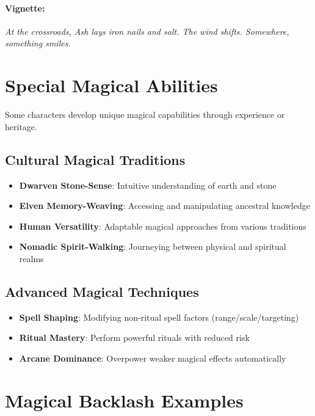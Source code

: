 \paragraph{Vignette:}
\emph{At the crossroads, Ash lays iron nails and salt. The wind shifts. Somewhere, something smiles.}

\section{Special Magical Abilities} 

Some characters develop unique magical capabilities through experience or heritage.

\subsection*{Cultural Magical Traditions}
\begin{itemize}
\item \textbf{Dwarven Stone-Sense}: Intuitive understanding of earth and stone
\item \textbf{Elven Memory-Weaving}: Accessing and manipulating ancestral knowledge
\item \textbf{Human Versatility}: Adaptable magical approaches from various traditions
\item \textbf{Nomadic Spirit-Walking}: Journeying between physical and spiritual realms
\end{itemize}

\subsection*{Advanced Magical Techniques}
\begin{itemize}
\item \textbf{Spell Shaping}: Modifying non-ritual spell factors (range/scale/targeting)
\item \textbf{Ritual Mastery}: Perform powerful rituals with reduced risk
\item \textbf{Arcane Dominance}: Overpower weaker magical effects automatically
\end{itemize}

\section{Magical Backlash Examples} 

